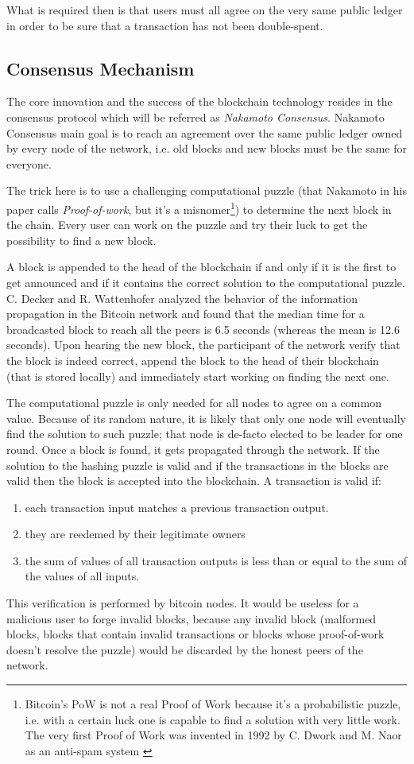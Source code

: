 		What is required then is that users must all agree on the very same public ledger in order to be sure that a transaction has not been double-spent. 
		
	\subsection{Consensus Mechanism}
		The core innovation and the success of the blockchain technology resides in the consensus protocol which will be referred as \textit{Nakamoto Consensus}. Nakamoto Consensus main goal is to reach an agreement over the same public ledger owned by every node of the network, i.e. old blocks and new blocks must be the same for everyone.

		The trick here is to use a challenging computational puzzle (that Nakamoto in his paper calls \textit{Proof-of-work}, but it's a misnomer\footnote{Bitcoin's PoW is not a real Proof of Work because it's a probabilistic puzzle, i.e. with a certain luck one is capable to find a solution with very little work. The very first Proof of Work was invented in 1992 by C. Dwork and M. Naor as an anti-spam system \cite{Dwork1992}}) to determine the next block in the chain. Every user can work on the puzzle and try their luck to get the possibility to find a new block.
		
		A block is appended to the head of the blockchain if and only if it is the first to get announced and if it contains the correct solution to the computational puzzle. C. Decker and R. Wattenhofer \cite{Decker2013} analyzed the behavior of the information propagation in the Bitcoin network and found that the median time for a broadcasted block to reach all the peers is 6.5 seconds (whereas the mean is 12.6 seconds). Upon hearing the new block, the participant of the network verify that the block is indeed correct, append the block to the head of their blockchain (that is stored locally) and immediately start working on finding the next one.
		
		The computational puzzle is only needed for all nodes to agree on a common value. Because of its random nature, it is likely that only one node will eventually find the solution to such puzzle; that node is de-facto elected to be leader for one round. Once a block is found, it gets propagated through the network. If the solution to the hashing puzzle is valid and if the transactions in the blocks are valid then the block is accepted into the blockchain. A transaction is valid if:
		\begin{enumerate}
			\item each transaction input matches a previous transaction output.
			\item they are reedemed by their legitimate owners
			\item the sum of values of all transaction outputs is less than or equal to the sum of the values of all inputs.
		\end{enumerate}		
		This verification is performed by bitcoin nodes. It would be useless for a malicious user to forge invalid blocks, because any invalid block (malformed blocks, blocks that contain invalid transactions or blocks whose proof-of-work doesn't resolve the puzzle) would be discarded by the honest peers of the network. 
		
